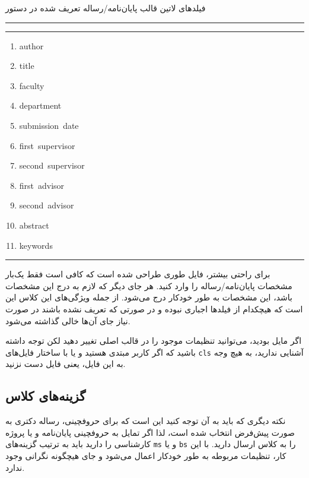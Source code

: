 \begin{table}[htb]
\caption{فیلدهای لاتین قالب پایان‌نامه/رساله تعریف شده در دستور }
\label{tab:latinfields}
\begin{latin}
\ttfamily
\smallskip
\hrule\hrule
\LTRmulticolcolumns
\begin{multicols*}{3}
    \begin{enumerate}
        \item author
        \item title
        \item faculty
        \item department
        \item submission~date
        \item first~supervisor
        \item second~supervisor
        \item first~advisor
        \item second~advisor
        \item abstract
        \item keywords
    \end{enumerate}
\end{multicols*}
\end{latin}
\hrule
\end{table}

    برای راحتی بیشتر،     فایل     
        طوری طراحی شده است که کافی است فقط  یک‌بار مشخصات پایان‌نامه/رساله  را وارد کنید. هر جای دیگر که لازم به درج این مشخصات باشد، 
        این مشخصات به طور خودکار درج می‌شود. از جمله ویژگی‌های این کلاس این است که هیچکدام از فیلدها اجباری نبوده و در صورتی که 
        تعریف نشده باشند در صورت نیاز جای آن‌ها خالی گذاشته می‌شود. 
        
        اگر مایل بودید، می‌توانید تنظیمات موجود را در قالب اصلی تغییر دهید لکن توجه داشته باشید که اگر کاربر مبتدی هستید 
        و یا با ساختار فایل‌های      \Verb!cls!     آشنایی ندارید، به هیچ وجه به این فایل، یعنی فایل     
        دست نزنید.

    \subsection{گزینه‌های کلاس}
    نکته دیگری که باید به آن توجه کنید این است که برای حروفچینی، رساله دکتری به صورت پیش‌فرض انتخاب شده است، لذا اگر 
    تمایل به حروفچینی پایان‌نامه و یا پروژه کارشناسی را دارید باید به ترتیب گزینه‌های \Verb+ms+ و یا \Verb+bs+ را به 
    کلاس      ارسال دارید. 
    با این کار، تنظیمات مربوطه به طور خودکار  اعمال می‌شود و جای هیچگونه نگرانی وجود ندارد.    
    
